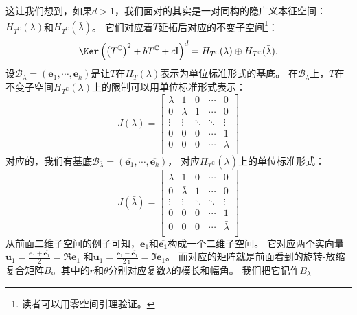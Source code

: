 \documentclass[12pt,UTF8]{ctexbook}
\begin{document}
这让我们想到，如果$d > 1$，我们面对的其实是一对同构的隐广义本征空间：$H_{T^\mathbb{C}}(\lambda)$和$H_{T^\mathbb{C}}(\bar{\lambda})$。
它们对应着$T$延拓后对应的不变子空间\footnote{读者可以用零空间引理验证。}：
$$\Ker \left(\left(T^\mathbb{C}\right)^2 + b T^\mathbb{C} + c\mathrm{I}\right)^{d} = H_{T^\mathbb{C}}(\lambda) \oplus H_{T^\mathbb{C}}(\bar{\lambda}). $$
设$\mathcal{B}_\lambda = (\mathbf{e}_1, \cdots , \mathbf{e}_k)$是让$T$在$H_T(\lambda)$表示为单位标准形式的基底。
在$\mathcal{B}_\lambda$上，$T$在不变子空间$H_{T^\mathbb{C}}(\lambda)$上的限制可以用单位标准形式表示：
$$ J(\lambda) = \begin{bmatrix}
    \lambda & 1 & 0 & \cdots & 0 \\
    0 & \lambda & 1 & \cdots & 0 \\
    \vdots & \vdots & \ddots & \ddots & \vdots  \\
    0 & 0 & 0 & \cdots & 1  \\
    0 & 0 & 0 & \cdots & \lambda \\
   \end{bmatrix} $$
对应的，我们有基底$\mathcal{B}_{\bar{\lambda}} = (\overline{\mathbf{e}_1}, \cdots , \overline{\mathbf{e}_k})$，
对应$H_{T^\mathbb{C}}(\bar{\lambda})$上的单位标准形式：
$$ J(\bar{\lambda}) = \begin{bmatrix}
    \bar{\lambda} & 1 & 0 & \cdots & 0 \\
    0 & \bar{\lambda} & 1 & \cdots & 0 \\
    \vdots & \vdots & \ddots & \ddots & \vdots  \\
    0 & 0 & 0 & \cdots & 1  \\
    0 & 0 & 0 & \cdots & \bar{\lambda} \\
   \end{bmatrix} $$
从前面二维子空间的例子可知，$\mathbf{e}_1$和$\overline{\mathbf{e}_1}$构成一个二维子空间。
它对应两个实向量$\mathbf{u}_1 = \frac{\mathbf{e}_1 + \overline{\mathbf{e}_1}}{2} = \Re\mathbf{e}_1$
和$\mathbf{u}_1 = \frac{\mathbf{e}_1 - \overline{\mathbf{e}_1}}{2\imath } = \Im\mathbf{e}_1$。
而对应的矩阵就是前面看到的旋转-放缩复合矩阵$B$。其中的$r$和$\theta$分别对应复数$\lambda$的模长和幅角。
我们把它记作$B_\lambda$
\end{document}
